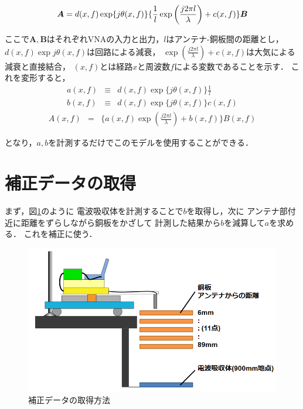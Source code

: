 ﻿\documentclass[12pt,oneside]{jsbook}
\begin{document}
\begin{equation}
{\bm A} = d(x,f)\exp\{ {j\theta(x,f)} \} \{ \frac{1}{l}\exp{ \left( \frac{j2\pi l}{\lambda} \right) }
+c(x,f) \} {\bm B}\\
\label{calib1}
\end{equation}

ここで${\bm A},{\bm B}$はそれぞれVNAの入力と出力，$l$はアンテナ-銅板間の距離とし，
$d(x,f)\exp{j\theta(x,f)}$は回路による減衰，
$\exp{\left( \frac{j2\pi l}{\lambda} \right) }+c(x,f)$は大気による減衰と直接結合，
$(x,f)$とは経路$x$と周波数$f$による変数であることを示す．
これを変形すると，
\begin{eqnarray*}
a(x,f) &\equiv& d(x,f)\exp{ \{ j\theta(x,f)\} }\frac{1}{l} \\
b(x,f) &\equiv& d(x,f)\exp{ \{ j\theta(x,f)\} }c(x,f)
\end{eqnarray*}
\begin{eqnarray}
A(x,f) &=& \{ a(x,f)\exp{ \left( \frac{j2\pi l}{\lambda}\right) }+b(x,f)\}B(x,f)
\label{calib2}
\end{eqnarray}

となり，$a,b$を計測するだけでこのモデルを使用することができる．
\section{補正データの取得}
まず，図\ref{hosei5}のように
電波吸収体を計測することで$b$を取得し，次に
アンテナ部付近に距離をずらしながら銅板をかざして
計測した結果から$b$を減算して$a$を求める．
これを補正に使う．

\begin{figure}[t]
\includegraphics[width =\hsize]{h5-syutokuhouhou.png}
\caption{補正データの取得方法}
\label{hosei5}
\end{figure}
\end{document}

